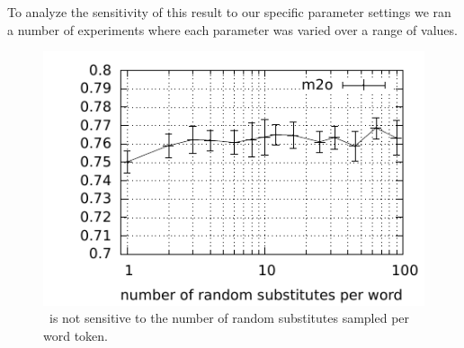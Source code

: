 

To analyze the sensitivity of this result to our specific parameter
settings we ran a number of experiments where each parameter was
varied over a range of values.



\begin{figure}[ht] \centering
\includegraphics[width=0.5\linewidth]{plot-s-cl.pdf}
\caption{\mto\ is not sensitive to the number of random substitutes
  sampled per word token.}
\label{plot-s}
\end{figure}

